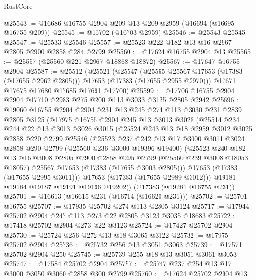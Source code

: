\begin{lexlean}{RustCore}
\begin{coremodule}
@25543 := @16686 @16755 @2904 @209 @13 @209 @2959 (@16694 (@16695 @16755 @209))
@25545 := @16702 (@16703 @2959)
@25546 := @25543 @25545
@25547 := @25533 @25546
@25557 := @25523 @222 @182 @13 @16 @2967 @2805 @2900 @2858 @284 @2799
@25560 := @17624 @16755 @2904 @13
@25565 := @25557 (@25560 @221 @2967 @18868 @18872)
@25567 := @17647 @16755 @2904
@25587 := @25512
    (@25521
      (@25547
        (@25565 @25567 @17653 (@17383 (@17655 @2962 @2805)))
        @17653
        (@17383 (@17655 @2955 @2970)))
      @17671
      @17675
      @17680
      @17685
      @17691
      @17700)
@25599 := @17706 @16755 @2904 @2904 @17710 @2983 @275 @200 @113 @3033 @3125 @2805 @2942
@25696 := @19060
    @16755
    @2904
    @2904
    @231
    @13
    @245
    @274
    @113
    @3030
    @231
    @2839
    @2805
    @3125
    (@17975
      @16755
      @2904
      @245
      @13
      @3013
      @3028
      (@25514
        @234
        @244
        @22
        @13
        @3013
        @3026
        @3015
        (@25524
          @243
          @13
          @18
          @2959
          @3012
          @3025
          @2858
          @220
          @2799
          @25546
          (@25523
            @237
            @242
            @13
            @17
            @3000
            @3011
            @3024
            @2858
            @290
            @2799
            (@25560 @236 @3000 @19396 @19400)
            (@25523
              @240
              @182
              @13
              @16
              @3008
              @2805
              @2900
              @2858
              @295
              @2799
              (@25560 @239 @3008 @18053 @18057)
              @25567
              @17653
              (@17383 (@17655 @3003 @2805)))
            @17653
            (@17383 (@17655 @2995 @3011)))
          @17653
          (@17383 (@17655 @2989 @3012)))
        @19181
        @19184
        @19187
        @19191
        @19196
        @19202))
    (@17383 (@19281 @16755 @231))
@25701 := @16613 (@16615 @231 (@16714 (@16620 @231)))
@25702 := @25701 @16755
@25707 := @17935 @25702 @274 @113 @2805 @3124
@25717 := @17944 @25702 @2904 @247 @113 @273 @22 @2805 @3123 @3035 @18683
@25722 := @17418 @25702 @2904 @273 @22 @3123
@25724 := @17427 @25702 @2904
@25730 := @25724 @256 @272 @13 @18 @3065 @3122
@25732 := @17975 @25702 @2904
@25736 := @25732 @256 @13 @3051 @3063
@25739 := @17571 @25702 @2904 @250
@25745 := @25739 @255 @18 @13 @3051 @3061 @3053
@25747 := @17584 @25702 @2904
@25757 := @25747 @237 @254 @13 @17 @3000 @3050 @3060 @2858 @300 @2799
@25760 := @17624 @25702 @2904 @13

\end{coremodule}
\end{lexlean}
